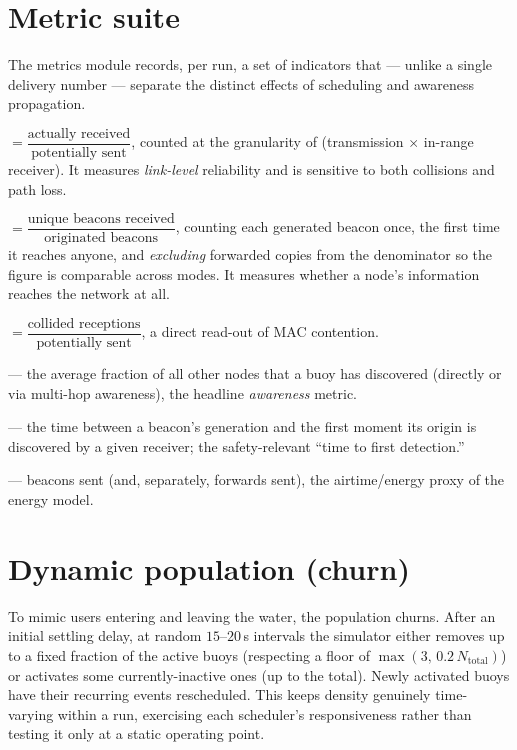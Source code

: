 \documentclass[12pt,a4paper,oneside]{report}
\begin{document}
\section{Metric suite}
The metrics module records, per run, a set of indicators that --- unlike a single
delivery number --- separate the distinct effects of scheduling and awareness
propagation.

\begin{description}[leftmargin=1.6em,style=nextline]
  \item[Per-receiver delivery ratio (PDR)] $=\dfrac{\text{actually received}}{\text{potentially sent}}$,
  counted at the granularity of (transmission $\times$ in-range receiver). It
  measures \emph{link-level} reliability and is sensitive to both collisions and
  path loss.
  \item[Network delivery ratio] $=\dfrac{\text{unique beacons received}}{\text{originated beacons}}$,
  counting each generated beacon once, the first time it reaches anyone, and
  \emph{excluding} forwarded copies from the denominator so the figure is
  comparable across modes. It measures whether a node's information reaches the
  network at all.
  \item[Collision rate] $=\dfrac{\text{collided receptions}}{\text{potentially sent}}$,
  a direct read-out of MAC contention.
  \item[Network-discovery percentage] --- the average fraction of all other nodes
  that a buoy has discovered (directly or via multi-hop awareness), the headline
  \emph{awareness} metric.
  \item[Reaction latency] --- the time between a beacon's generation and the first
  moment its origin is discovered by a given receiver; the safety-relevant
  ``time to first detection.''
  \item[Channel load] --- beacons sent (and, separately, forwards sent), the
  airtime/energy proxy of the energy model.
\end{description}

\section{Dynamic population (churn)}
To mimic users entering and leaving the water, the population churns. After an
initial settling delay, at random $15$--$20$\,s intervals the simulator either
removes up to a fixed fraction of the active buoys (respecting a floor of
$\max(3,\,0.2\,N_{\text{total}})$) or activates some currently-inactive ones (up
to the total). Newly activated buoys have their recurring events rescheduled.
This keeps density genuinely time-varying within a run, exercising each
scheduler's responsiveness rather than testing it only at a static operating
point.
\end{document}
